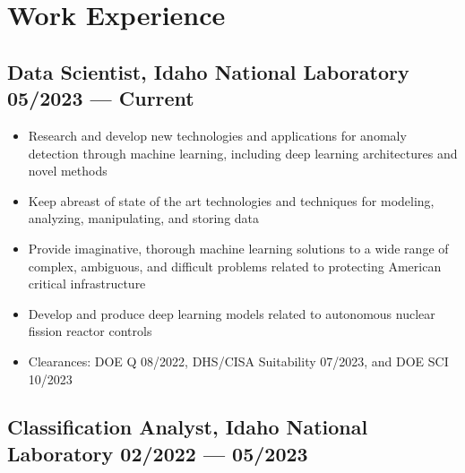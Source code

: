 \documentclass[letterpaper,11pt]{article}
\begin{document}
\section*{\color{cvblue}Work Experience } 

\subsection*{{\color{cvblue}Data Scientist, Idaho National Laboratory } \hfill 05/2023 — Current} 
\begin{itemize}
    \setlength{\itemsep}{-.5pt}
    \item  Research and develop new technologies and applications for anomaly detection through machine learning, including deep learning architectures and novel methods
    \item  Keep abreast of state of the art technologies and techniques for modeling, analyzing, manipulating, and storing data
    \item  Provide imaginative, thorough machine learning solutions to a wide range of complex, ambiguous, and difficult problems related to protecting American critical infrastructure
    \item  Develop and produce deep learning models related to autonomous nuclear fission reactor controls
    \item  Clearances: DOE Q 08/2022, DHS/CISA Suitability 07/2023, and DOE SCI 10/2023
\end{itemize}


\subsection*{{\color{cvblue}Classification Analyst, Idaho National Laboratory } \hfill 02/2022 — 05/2023} 
 
\end{document}
